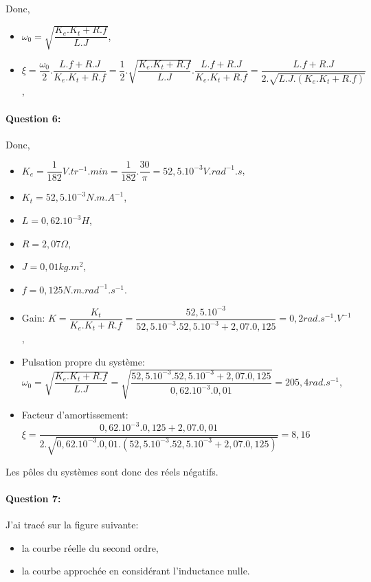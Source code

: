 Donc,

\begin{itemize}
 \item $\omega_0=\sqrt{\dfrac{K_e.K_t+R.f}{L.J}}$,
 \item $\xi=\dfrac{\omega_0}{2}.\dfrac{L.f+R.J}{K_e.K_t+R.f}=\dfrac{1}{2}.\sqrt{\dfrac{K_e.K_t+R.f}{L.J}}.\dfrac{L.f+R.J}{K_e.K_t+R.f}=\dfrac{L.f+R.J}{2.\sqrt{L.J.(K_e.K_t+R.f)}}$,
\end{itemize}

\paragraph{Question 6:}

Donc,

\begin{itemize}
 \item $K_e=\dfrac{1}{182}V.tr^{-1}.min=\dfrac{1}{182}.\dfrac{30}{\pi}=52,5.10^{-3}V.rad^{-1}.s$,
 \item $K_t=52,5.10^{-3}N.m.A^{-1}$,
 \item $L=0,62.10^{-3}H$,
 \item $R=2,07\Omega$,
 \item $J=0,01kg.m^2$,
 \item $f=0,125N.m.rad^{-1}.s^{-1}$.
\end{itemize}

\begin{itemize}
 \item Gain: $K=\dfrac{K_t}{K_e.K_t+R.f}=\dfrac{52,5.10^{-3}}{52,5.10^{-3}.52,5.10^{-3}+2,07.0,125}=0,2rad.s^{-1}.V^{-1}$,
 \item Pulsation propre du système: $\omega_0=\sqrt{\dfrac{K_e.K_t+R.f}{L.J}}=\sqrt{\dfrac{52,5.10^{-3}.52,5.10^{-3}+2,07.0,125}{0,62.10^{-3}.0,01}}=205,4rad.s^{-1}$,
 \item Facteur d'amortissement: $\xi=\dfrac{0,62.10^{-3}.0,125+2,07.0,01}{2.\sqrt{0,62.10^{-3}.0,01.(52,5.10^{-3}.52,5.10^{-3}+2,07.0,125)}}=8,16$
\end{itemize}

Les pôles du systèmes sont donc des réels négatifs.

\paragraph{Question 7:}

J'ai tracé sur la figure suivante:
\begin{itemize}
 \item la courbe réelle du second ordre,
 \item la courbe approchée en considérant l'inductance nulle.
\end{itemize}

